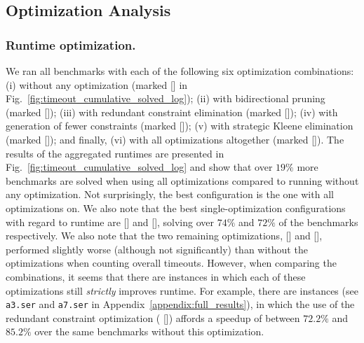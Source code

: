 \begin{table}[htbp]
	\centering
	
	\caption{Overview of benchmarks from the \textit{network and system protocols} category. 
}
\label{tab:networking-benchmarks}
\end{table}


\subsection{Optimization Analysis}
\label{subsec:optimization-results}

%


\subsubsection{Runtime optimization.}

We ran all benchmarks with each of the following six optimization combinations: 
(i) without any optimization (marked [\texttt{\textbf{\text{-}\text{-}\text{-}\text{-}}}] in Fig.~\ref{fig:timeout_cumulative_solved_log}); (ii) with bidirectional pruning (marked [\texttt{\textbf{\text{-}\text{-}\text{-}}}]); (iii) with redundant constraint elimination (marked [\texttt{\textbf{\text{-}\text{-}\text{-}}}]); (iv) with generation of fewer constraints (marked [\texttt{\textbf{\text{-}\text{-}\text{-}}}]);
(v) with strategic Kleene elimination (marked [\texttt{\textbf{\text{-}\text{-}\text{-}}}]);
and finally, (vi) with all optimizations altogether (marked [\texttt{\textbf{}}]).
%
The results of the aggregated runtimes are presented in Fig.~\ref{fig:timeout_cumulative_solved_log} and show that over $19\%$ more benchmarks are solved when using all optimizations compared to running without any optimization.
%
Not surprisingly, the best configuration is the one with all optimizations on. 
%
We also note that the best single-optimization configurations with regard to runtime are [\texttt{\textbf{\text{-}\text{-}\text{-}}}] and [\texttt{\textbf{\text{-}\text{-}\text{-}}}], solving over $74\%$ and $72\%$ of the benchmarks respectively. 
%
We also note that the two remaining optimizations, [\texttt{\textbf{\text{-}\text{-}\text{-}}}] and [\texttt{\textbf{\text{-}\text{-}\text{-}}}], performed slightly worse (although not significantly) than without the optimizations when counting overall timeouts.
%
However, when comparing the combinations, it seems that there are instances in which each of these optimizations still \textit{strictly} improves runtime.
%
For example, there are instances (see \texttt{a3.ser} and \texttt{a7.ser} in Appendix~\ref{appendix:full_results}), in which the use of the redundant constraint optimization (  [\texttt{\textbf{\text{-}\text{-}\text{-}}}])
affords a speedup of between $72.2\%$ and $85.2\%$ over the same benchmarks without this optimization.

